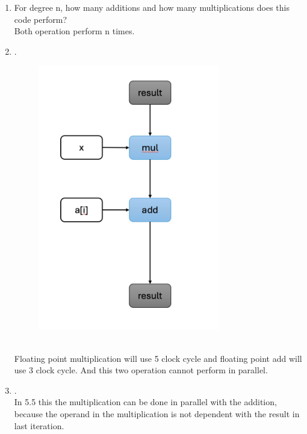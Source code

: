 \documentclass{article}
\begin{document}
\begin{enumerate}[label=\textbf{\Alph*.}]
	\item For degree n, how many additions and how many multiplications does this
	code perform? \\
	Both operation perform n times.
	\item . \\
	\begin{figure}[h]
		\centering
		\includegraphics[width=0.75\textwidth]{fig1}
	\end{figure} \\
	Floating point multiplication will use 5 clock cycle and floating
	point add will use 3 clock cycle. And this two operation cannot
	perform in parallel.
	\item . \\
	In 5.5 this the multiplication can be done in parallel with the
	addition, because the operand in the multiplication is not
	dependent with the result in last iteration.
\end{enumerate}
\end{document}
